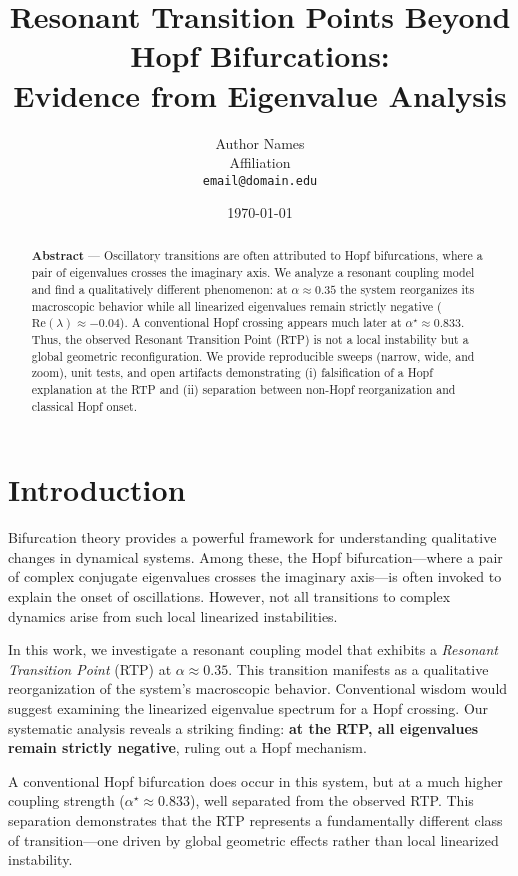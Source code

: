 \documentclass[11pt,twocolumn]{article}
\title{Resonant Transition Points Beyond Hopf Bifurcations:\\
Evidence from Eigenvalue Analysis}
\author{%
  Author Names\\
  Affiliation\\
  \texttt{email@domain.edu}
}
\date{\today}
\begin{document}
\maketitle

\begin{abstract}
\textbf{Abstract} — Oscillatory transitions are often attributed to Hopf bifurcations, where a pair of
eigenvalues crosses the imaginary axis. We analyze a resonant coupling model and find a qualitatively
different phenomenon: at $\alpha\approx0.35$ the system reorganizes its macroscopic behavior while all
linearized eigenvalues remain strictly negative ($\mathrm{Re}(\lambda)\approx -0.04$). A conventional Hopf
crossing appears much later at $\alpha^\star\approx0.833$. Thus, the observed Resonant Transition Point (RTP)
is not a local instability but a global geometric reconfiguration. We provide reproducible sweeps (narrow,
wide, and zoom), unit tests, and open artifacts demonstrating (i) falsification of a Hopf explanation at the
RTP and (ii) separation between non-Hopf reorganization and classical Hopf onset.
\end{abstract}

\section{Introduction}

Bifurcation theory provides a powerful framework for understanding qualitative changes in dynamical systems.
Among these, the Hopf bifurcation—where a pair of complex conjugate eigenvalues crosses the imaginary axis—is
often invoked to explain the onset of oscillations. However, not all transitions to complex dynamics arise
from such local linearized instabilities.

In this work, we investigate a resonant coupling model that exhibits a \emph{Resonant Transition Point} (RTP)
at $\alpha \approx 0.35$. This transition manifests as a qualitative reorganization of the system's macroscopic
behavior. Conventional wisdom would suggest examining the linearized eigenvalue spectrum for a Hopf crossing.
Our systematic analysis reveals a striking finding: \textbf{at the RTP, all eigenvalues remain strictly negative},
ruling out a Hopf mechanism.

A conventional Hopf bifurcation does occur in this system, but at a much higher coupling strength
($\alpha^\star \approx 0.833$), well separated from the observed RTP. This separation demonstrates that the RTP
represents a fundamentally different class of transition—one driven by global geometric effects rather than
local linearized instability.
\end{document}
